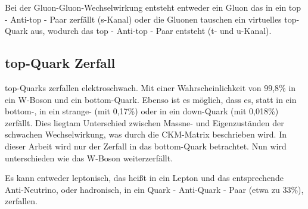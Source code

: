 \documentclass[
a4paper,                                %
twoside,                                %
BCOR1.4cm,                      %
ngerman,                                %
10pt,                           %
headings=normal,                %
headsepline,                    %
clearplainpage, %
final,                                  %
div=14,
parskip=full
]{scrbook}
\begin{document}
Bei der Gluon-Gluon-Wechselwirkung entsteht entweder ein Gluon das in ein top - Anti-top  - Paar zerf\"allt (s-Kanal) oder die Gluonen tauschen ein virtuelles top-Quark aus, wodurch das top - Anti-top - Paar entsteht (t- und u-Kanal).

\subsection{top-Quark Zerfall}

top-Quarks zerfallen elektroschwach. Mit einer Wahrscheinlichkeit von 99{,}8\% in ein W-Boson und ein bottom-Quark. Ebenso ist es m\"oglich, dass es, statt in ein bottom-, in ein strange- (mit 0,17\%) oder in ein down-Quark (mit 0,018\%) zerf\"allt. Dies liegtam Unterschied zwischen Massne- und Eigenzust\"anden der schwachen Wechselwirkung, was durch die CKM-Matrix beschrieben wird. In dieser Arbeit wird nur der Zerfall in das bottom-Quark betrachtet. Nun wird unterschieden wie das W-Boson weiterzerf\"allt. \cite{Griffiths} \cite{Vorlesung}

Es kann entweder leptonisch, das hei\ss t in ein Lepton und das entsprechende Anti-Neutrino, oder hadronisch, in ein Quark - Anti-Quark - Paar (etwa zu 33\%), zerfallen. \cite{Vorlesung}
\end{document}
